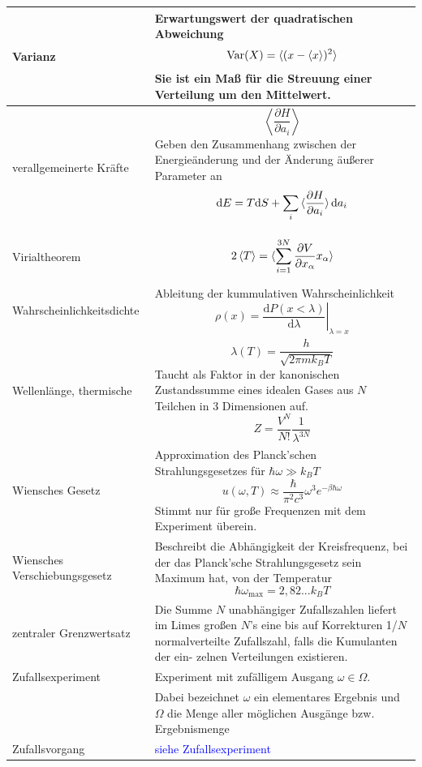 \documentclass{article}
\newcommand{\diff}{\mathrm{d}}
\begin{document}
\begin{xltabular}{\linewidth}{p{6cm}|X}
	\hline
		Varianz & Erwartungswert der quadratischen Abweichung
			$$\text{Var}(X) = \braket{(x - \braket{x})^2}$$
			Sie ist ein Maß für die Streuung einer Verteilung um den Mittelwert. \\
	\hline
		verallgemeinerte Kräfte & $$\left\langle \frac{\partial H}{\partial a_i} \right\rangle$$ 
		Geben den Zusammenhang zwischen der Energieänderung und der Änderung äußerer Parameter an
			$$\diff E = T\diff S + \sum_i \braket{\frac{\partial H}{\partial a_i}} \diff a_i$$ \\
	\hline
		Virialtheorem &
			$$2\braket{T} = \braket{\sum_{i=1}^{3N} \frac{\partial V}{\partial x_\alpha} x_\alpha}$$ \\
	\hline
		Wahrscheinlichkeitsdichte & Ableitung der kummulativen Wahrscheinlichkeit
			$$\rho(x) = \left.\frac{\diff P(x<\lambda)}{\diff \lambda}\right|_{\lambda=x}$$ \\
	\hline
		Wellenlänge, thermische & 
			$$\lambda(T) = \frac{h}{\sqrt{2\pi m k_B T}}$$
		\textcolor{gruen}{Taucht als Faktor in der kanonischen Zustandssumme eines idealen Gases aus $N$ Teilchen in 3 Dimensionen auf.
			$$Z = \frac{V^N}{N!}\frac{1}{\lambda^{3N}}$$} \\
	\hline
		Wiensches Gesetz & Approximation des Planck'schen Strahlungsgesetzes für $\hbar\omega \gg k_B T$
			$$u(\omega,T) \approx \frac{\hbar}{\pi^2 c^3} \omega^3 e^{-\beta \hbar \omega}$$
		Stimmt nur für große Frequenzen mit dem Experiment überein. \\
	\hline
		Wiensches Verschiebungsgesetz & Beschreibt die Abhängigkeit der Kreisfrequenz, bei der das Planck'sche Strahlungsgesetz sein Maximum hat, von der Temperatur
			$$\hbar\omega_{\text{max}} = 2,82... k_B T$$ \\
	\hline
		zentraler Grenzwertsatz & Die Summe $N$ unabhängiger Zufallszahlen liefert im Limes großen $N$’s eine bis auf Korrekturen 1/$N$ normalverteilte Zufallszahl, falls die Kumulanten der ein-
zelnen Verteilungen existieren. \\
	\hline
		Zufallsexperiment & Experiment mit zufälligem Ausgang $\omega\in\Omega$. \\
		& Dabei bezeichnet $\omega$ ein elementares Ergebnis und $\Omega$ die Menge aller möglichen Ausgänge bzw. Ergebnismenge \\
	\hline
		Zufallsvorgang & \textcolor{blue}{siehe Zufallsexperiment}\\
	\hline\hline
 \end{xltabular}
\end{document}
